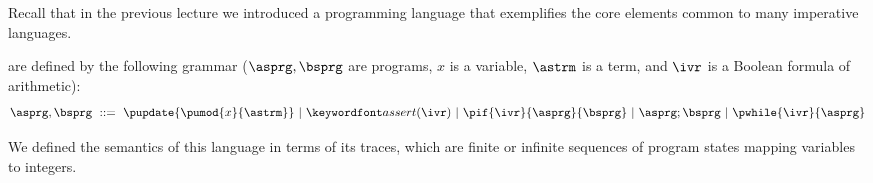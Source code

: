 \documentclass[11pt,twoside]{scrartcl}
\begin{document}
Recall that in the previous lecture we introduced a programming language that exemplifies the core elements common to many imperative languages.

\begin{definition}[Program] \label{def:deterministic-program}
 are defined by the following grammar ($\asprg,\bsprg$ are programs, $x$ is a variable, $\astrm$ is a term, and $\ivr$ is a Boolean formula of arithmetic):%
\indexn{\cup}\indexn{;}\indexn{{}^*}\indexn{{:}{=}}\index{\ptest{\ivr}}%
\begin{equation*}
  \asprg,\bsprg ~\bebecomes~
  \pupdate{\pumod{x}{\astrm}}
  \alternative
  \passert{\ivr}
  \alternative
  \pif{\ivr}{\asprg}{\bsprg}
  \alternative
  \asprg;\bsprg
  \alternative
  \pwhile{\ivr}{\asprg}
\end{equation*}
\end{definition}

We defined the semantics of this language in terms of its traces, which are finite or infinite sequences of program states mapping variables to integers.
\end{document}
